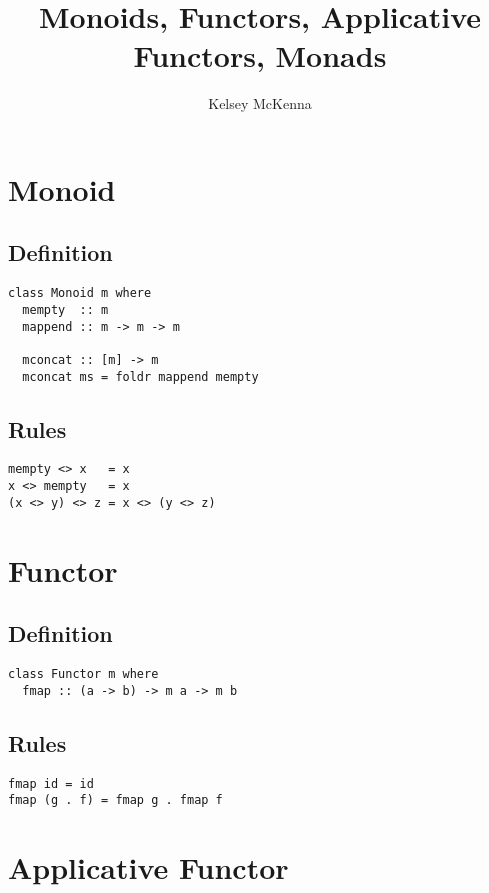 \documentclass[12pt, twocolumn]{article}
\title{\vspace{-4cm}Monoids, Functors, Applicative Functors, Monads}
\author{Kelsey McKenna}
\date{}
\begin{document}
\maketitle

\section*{Monoid}

\subsection*{Definition}
\begin{verbatim}
class Monoid m where
  mempty  :: m
  mappend :: m -> m -> m

  mconcat :: [m] -> m
  mconcat ms = foldr mappend mempty
\end{verbatim}

\subsection*{Rules}
\begin{verbatim}
mempty <> x   = x
x <> mempty   = x
(x <> y) <> z = x <> (y <> z)
\end{verbatim}

\section*{Functor}

\subsection*{Definition}
\begin{verbatim}
class Functor m where
  fmap :: (a -> b) -> m a -> m b
\end{verbatim}

\subsection*{Rules}
\begin{verbatim}
fmap id = id
fmap (g . f) = fmap g . fmap f
\end{verbatim}

\newpage

\section*{Applicative Functor}
\end{document}
